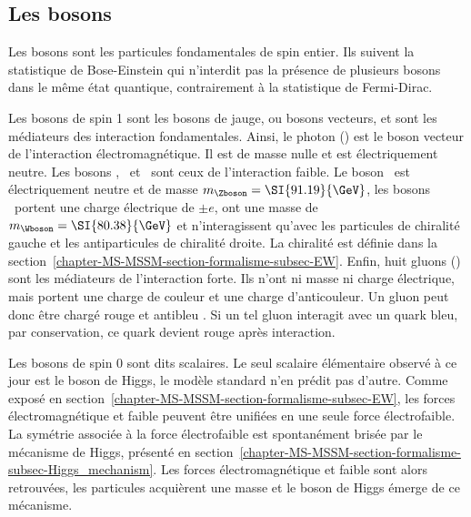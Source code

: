 \subsection{Les bosons}\label{chapter-MS-MSSM-section-SM_ptcs-subsec-bosons}
Les bosons sont les particules fondamentales de spin entier.
Ils suivent la statistique de Bose-Einstein qui n'interdit pas la présence de plusieurs bosons dans le même état quantique, contrairement à la statistique de Fermi-Dirac.
\par
Les bosons de spin 1 sont les bosons de jauge, ou bosons vecteurs, et sont les médiateurs des interaction fondamentales.
Ainsi, le photon (\photon) est le boson vecteur de l'interaction électromagnétique. Il est de masse nulle et est électriquement neutre.
Les bosons \Wbosonplus, \Wbosonminus\ et \Zboson\ sont ceux de l'interaction faible. Le boson \Zboson\ est électriquement neutre et de masse $m_\Zboson=\SI{91.19}{\GeV}$, les bosons \Wboson\ portent une charge électrique de $\pm e$, ont une masse de $m_\Wboson=\SI{80.38}{\GeV}$ et n'interagissent qu'avec les particules de chiralité gauche et les antiparticules de chiralité droite.
La chiralité est définie dans la section~\ref{chapter-MS-MSSM-section-formalisme-subsec-EW}.
Enfin, huit gluons (\gluon) sont les médiateurs de l'interaction forte. Ils n'ont ni masse ni charge électrique, mais portent une charge de couleur et une charge d'anticouleur. Un gluon peut donc être chargé \og rouge et antibleu \fg{}. Si un tel gluon interagit avec un quark bleu, par conservation, ce quark devient rouge après interaction.
\par
Les bosons de spin 0 sont dits scalaires.
Le seul scalaire élémentaire observé à ce jour est le boson de Higgs, le modèle standard n'en prédit pas d'autre.
Comme exposé en section~\ref{chapter-MS-MSSM-section-formalisme-subsec-EW},
les forces électromagnétique et faible peuvent être unifiées en une seule force électrofaible.
La symétrie associée à la force électrofaible est spontanément brisée
par le mécanisme de Higgs,
présenté en section~\ref{chapter-MS-MSSM-section-formalisme-subsec-Higgs_mechanism}.
Les forces électromagnétique et faible
sont alors retrouvées,
les particules acquièrent une masse
et le boson de Higgs émerge de ce mécanisme.

%
%
